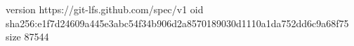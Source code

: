 version https://git-lfs.github.com/spec/v1
oid sha256:e1f7d24609a445e3abc54f34b906d2a8570189030d1110a1da752dd6c9a68f75
size 87544
